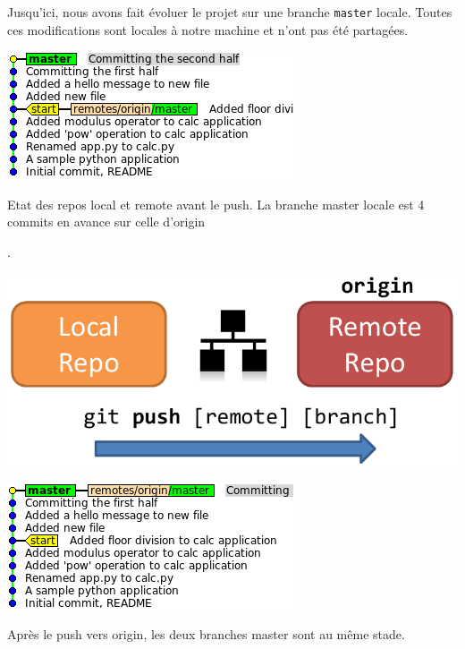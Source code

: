 \documentclass{../../common/tufte-latex/tufte-handout}
\begin{document}
Jusqu'ici, nous avons fait évoluer le projet sur une branche \texttt{master} locale.
Toutes ces modifications sont locales à notre machine et n'ont pas été partagées.

\begin{marginfigure}%
  \centering
  \includegraphics[width=\linewidth]{gitcommit-pre-push.png}
  \label{fig:gitcommit-pre-push}
  \caption{Etat des repos local et remote avant le push. La branche master locale est 4 commits en avance sur celle d'origin}.
\end{marginfigure}
\begin{marginfigure}%
  \centering
  \includegraphics[width=\linewidth]{gitpush-schema.pdf}
  \label{fig:gitpush-schema}
\end{marginfigure}
\begin{marginfigure}%
  \centering
  \includegraphics[width=\linewidth]{gitcommit-post-push.png}
  \label{fig:gitcommit-post-push}
  \caption{Après le push vers origin, les deux branches master sont au même stade.}
\end{marginfigure}
\end{document}
